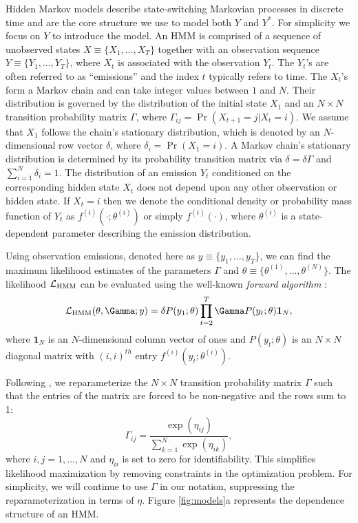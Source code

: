Hidden Markov models describe state-switching Markovian processes in discrete time and are the core structure we use to model both $Y$ and $Y^*$. For simplicity we focus on $Y$ to introduce the model. An HMM is comprised of a sequence of unobserved states $X \equiv \big\{X_1, \ldots, X_T\big\}$ together with an observation sequence $Y \equiv \big\{Y_1, \ldots, Y_T\big\}$, where $X_t$ is associated with the observation $Y_t$. The $Y_t$'s are often referred to as ``emissions'' and the index $t$ typically refers to time. 
The $X_t$'s form a Markov chain and can take integer values between $1$ and $N$. Their distribution is governed by the distribution of the initial state $X_1$ and an $N \times N$ transition probability matrix $\Gamma$, where $\Gamma_{ij} = \Pr(X_{t+1} = j | X_t = i)$. 
%
We assume that $X_1$ follows the chain's stationary distribution, which is denoted by an $N$-dimensional row vector $\delta$, where
$\delta_i = \Pr(X_1 = i).$
A Markov chain's stationary distribution is determined by its probability transition matrix via $\delta = \delta \Gamma$ and $\sum_{i=1}^N \delta_i = 1$.
%
The distribution of an emission $Y_t$ conditioned on the corresponding hidden state $X_t$ does not depend upon any other observation or hidden state.
%
If $X_t=i$ then we denote the conditional density or probability mass function of $Y_t$ as $f^{(i)}(\cdot ; \theta^{(i)})$ or simply $f^{(i)}(\cdot)$, where $\theta^{(i)}$ is a state-dependent parameter describing the emission distribution.
%

Using observation emissions, denoted here as $y \equiv \{y_1,\ldots,y_T\}$, we can find the maximum likelihood estimates of the parameters $\Gamma$ and $\theta \equiv \{\theta^{(1)},\ldots,\theta^{(N)}\}$. The likelihood $\mathcal{L}_{\text{HMM}}$ can be evaluated using the well-known \textit{forward algorithm} \citep{Zucchini:2016}:
%
$$\calL_{\text{HMM}}(\theta,\Gamma;y) = \delta P(y_1;\theta) \prod_{t=2}^T \Gamma P(y_t;\theta) \mathbf{1}_N,$$
%
where $\mathbf{1}_N$ is an $N$-dimensional column vector of ones and
%
$P(y_t;\theta)$ is an $N \times N$ diagonal matrix with $(i,i)^{th}$ entry $f^{(i)}(y_t; \theta^{(i)})$.
%

Following \citet{Barajas:2017}, we reparameterize the $N \times N$ transition probability matrix $\Gamma$ such that the entries of the matrix are forced to be non-negative and the rows sum to 1:
%
\[
\Gamma_{ij} = \frac{\exp(\eta_{ij})}{\sum_{k=1}^N \exp(\eta_{ik})}, 
\]
%
where $i,j = 1,\ldots,N$ and $\eta_{ii}$ is set to zero for identifiability. This simplifies likelihood maximization by removing constraints in the optimization problem. For simplicity, we will continue to use $\Gamma$ in our notation, suppressing the reparameterization in terms of $\eta$. Figure \ref{fig:models}a represents the dependence structure of an HMM.

